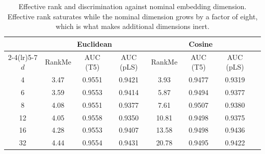 \begin{table}[t]
\centering
\caption{Effective rank and discrimination against nominal embedding dimension.
Effective rank saturates while the nominal dimension grows by a factor of eight,
which is what makes additional dimensions inert.}
\label{tab:dimsweep}
\begin{tabular}{cccccccc}
\toprule
& \multicolumn{3}{c}{Euclidean} & \multicolumn{3}{c}{Cosine} \\
\cmidrule(lr){2-4}\cmidrule(lr){5-7}
$d$ & RankMe & AUC (T5) & AUC (pLS) & RankMe & AUC (T5) & AUC (pLS) \\
\midrule
4 & 3.47 & 0.9551 & 0.9421 & 3.93 & 0.9477 & 0.9319 \\
6 & 3.59 & 0.9553 & 0.9414 & 5.87 & 0.9494 & 0.9377 \\
8 & 4.08 & 0.9551 & 0.9377 & 7.61 & 0.9507 & 0.9380 \\
12 & 4.05 & 0.9558 & 0.9350 & 10.81 & 0.9498 & 0.9375 \\
16 & 4.28 & 0.9553 & 0.9407 & 13.58 & 0.9498 & 0.9436 \\
32 & 4.44 & 0.9554 & 0.9431 & 20.78 & 0.9495 & 0.9422 \\
\bottomrule
\end{tabular}
\end{table}
